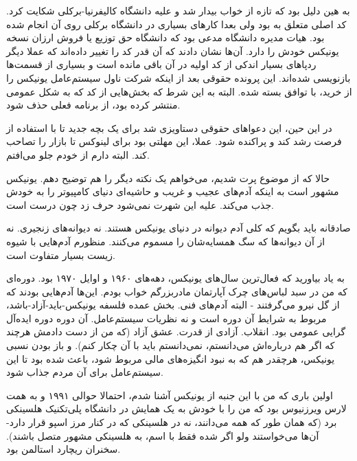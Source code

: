 به هین دلیل بود که  تازه از خواب بیدار شد و علیه دانشگاه
کالیفرنیا-برکلی شکایت کرد. کد اصلی متعلق به  بود ولی بعدا
کارهای بسیاری در دانشگاه برکلی روی آن انجام شده بود. هیات مدیره
دانشگاه مدعی بود که دانشگاه حق توزیع یا فروش ارزان نسخه یونیکس خودش را
دارد. آن‌ها نشان دادند که آن قدر کد را تغییر داده‌اند که عملا دیگر
ردپاهای بسیار اندکی از کد اولیه در آن باقی مانده است و بسیاری از
قسمت‌ها بازنویسی شده‌اند. این پرونده حقوقی بعد از اینکه شرکت
ناول سیستم‌عامل یونیکس را از  خرید، با
توافق بسته شده. البته به این شرط که بخش‌هایی از کد که  به شکل
عمومی منتشر کرده بود، از برنامه فعلی حذف شود.

در این حین، این دعواهای حقوقی دستاویزی شد برای یک بچه جدید تا با
استفاده از فرصت رشد کند و پراکنده شود. عملا، این مهلتی بود برای لینوکس
تا بازار را تصاحب کند. البته دارم از خودم جلو می‌افتم.

حالا که از موضوع پرت شدیم، می‌خواهم یک نکته دیگر را هم توضیح
دهم. یونیکس مشهور است به اینکه آدم‌های عجیب و غریب و حاشیه‌ای دنیای
کامپیوتر را به خودش جذب می‌کند. علیه این شهرت نمی‌شود حرف زد چون درست
است.

صادقانه باید بگویم که کلی آدم دیوانه در دنیای یونیکس هستند. نه
دیوانه‌های زنجیری. نه از آن دیوانه‌ها که سگ همسایه‌شان را مسموم
می‌کنند. منظورم آدم‌هایی با شیوه زیست بسیار متفاوت است.

به یاد بیاورید که فعال‌ترین سال‌های یونیکس، دهه‌های ۱۹۶۰ و اوایل ۱۹۷۰
بود. دوره‌ای که من در سبد لباس‌های چرک آپارتمان مادربزرگم خواب
بودم. این‌ها آدم‌هایی بودند که از گل نیرو می‌گرفتند - البته آدم‌های
فنی. بخش عمده فلسفه یونیکس-باید-آزاد-باشد، مربوط به شرایط آن دوره است
و نه نظریات سیستم‌عامل. آن دوره دوره ایده‌آل گرایی عمومی
بود. انقلاب. آزادی از قدرت. عشق آزاد (که من از دست دادمش هرچند که اگر
هم درباره‌اش می‌دانستم، نمی‌دانستم باید با آن چکار کنم). و باز بودن نسبی
یونیکس، هرچقدر هم که به نبود انگیزه‌های مالی مربوط شود، باعث شده بود تا
این سیستم‌عامل برای آن مردم جذاب شود.

اولین باری که من با این جنبه از یونیکس آشنا شدم، احتمالا حوالی ۱۹۹۱ و
به همت لارس ویرزنیوس بود که من را با خودش به
یک همایش در دانشگاه پلی‌تکنیک هلسینکی برد (که همان طور که همه می‌دانند،
نه در هلسینکی که در کنار مرز اسپو قرار دارد- آن‌ها می‌خواستند ولو اگر شده فقط با اسم، به هلسینکی
مشهور متصل باشند). سخنران ریچارد استالمن بود.

